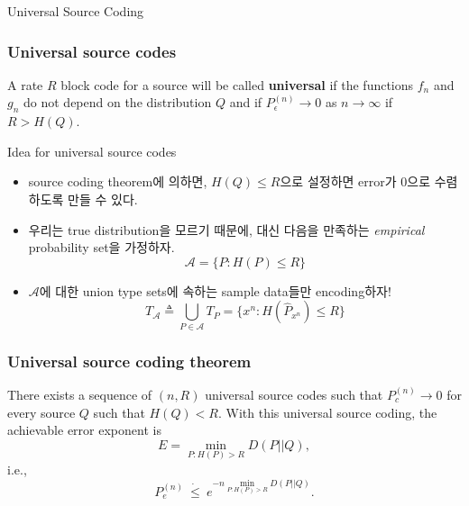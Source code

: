 \documentclass[9pt]{beamer}
\begin{document}
\begin{section}{Universal Source Coding}
        \begin{frame}
            \frametitle{Universal source codes}
            \begin{definition}
                A rate $R$ block code for a source will be called \textbf{universal} if the functions $f_n$ and $g_n$ do not depend on the distribution $Q$ and if $P_\epsilon^{(n)} \rightarrow 0$ as $n \rightarrow \infty$ if \alert{$R>H(Q)$}.

            \end{definition}
            \begin{block}{Idea for universal source codes}
                \begin{itemize}
                    \item source coding theorem에 의하면, $H(Q) \le R$으로 설정하면 error가 0으로 수렴하도록 만들 수 있다.
                    \item 우리는 true distribution을 모르기 때문에, 대신 다음을 만족하는 \textit{empirical} probability set을 가정하자. %
                    $$ \mathcal A = \{ P : H(P) \le R \}$$
                    \item $\mathcal A$에 대한 union type sets에 속하는 sample data들만 encoding하자!
                    $$ T_{\mathcal A} \triangleq \bigcup_{P \in \mathcal A} T_P = \{ x^n : H(\hat P_{x^n}) \le R \}$$
                \end{itemize}
            \end{block}
            
        \end{frame}

        \begin{frame}
            \frametitle{Universal source coding theorem}
            \begin{theorem}
                There exists a sequence of $(n, R)$ universal source codes such that $P_c^{(n)} \rightarrow 0$ for every source $Q$ such that $H(Q)<R$.  With this universal source coding, the achievable error exponent is
                $$
                E=\min _{P:  H(P)>R} D(P||Q),
                $$
                i.e.,  
                $$
                P_e^{(n)}\  \dot \leq \ e^{-n \min _{P:H(P)>R} D(P||Q)}. 
                $$
                

\end{theorem}
\end{frame}
\end{section}
\end{document}
